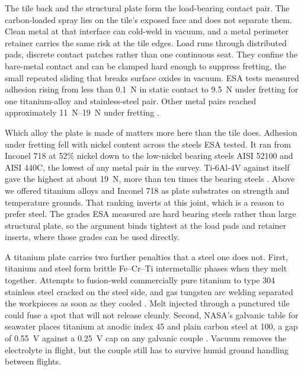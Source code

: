 \documentclass{article}
\begin{document}
The tile back and the structural plate form the load-bearing contact pair. The carbon-loaded spray lies on the tile's exposed face and does not separate them. Clean metal at that interface can cold-weld in vacuum, and a metal perimeter retainer carries the same risk at the tile edges. Load runs through distributed pads, discrete contact patches rather than one continuous seat. They confine the bare-metal contact and can be clamped hard enough to suppress fretting, the small repeated sliding that breaks surface oxides in vacuum. ESA tests measured adhesion rising from less than \SI{0.1}{\newton} in static contact to \SI{9.5}{\newton} under fretting for one titanium-alloy and stainless-steel pair. Other metal pairs reached approximately \SIrange{11}{19}{\newton} under fretting \cite{merstallinger_cold_welding}.

Which alloy the plate is made of matters more here than the tile does. Adhesion under fretting fell with nickel content across the steels ESA tested. It ran from Inconel 718 at 52\% nickel down to the low-nickel bearing steels AISI 52100 and AISI 440C, the lowest of any metal pair in the survey. Ti-6Al-4V against itself gave the highest at about \SI{19}{\newton}, more than ten times the bearing steels \cite{merstallinger_cold_welding}. Above we offered titanium alloys and Inconel 718 as plate substrates on strength and temperature grounds. That ranking inverts at this joint, which is a reason to prefer steel. The grades ESA measured are hard bearing steels rather than large structural plate, so the argument binds tightest at the load pads and retainer inserts, where those grades can be used directly.

A titanium plate carries two further penalties that a steel one does not. First, titanium and steel form brittle Fe--Cr--Ti intermetallic phases when they melt together. Attempts to fusion-weld commercially pure titanium to type 304 stainless steel cracked on the steel side, and gas tungsten arc welding separated the workpieces as soon as they cooled \cite{pasang2018_ti_ss_intermetallics}. Melt injected through a punctured tile could fuse a spot that will not release cleanly. Second, NASA's galvanic table for seawater places titanium at anodic index 45 and plain carbon steel at 100, a gap of \SI{0.55}{\volt} against a \SI{0.25}{\volt} cap on any galvanic couple \cite{nasa_std_6012a}. Vacuum removes the electrolyte in flight, but the couple still has to survive humid ground handling between flights.
\end{document}
